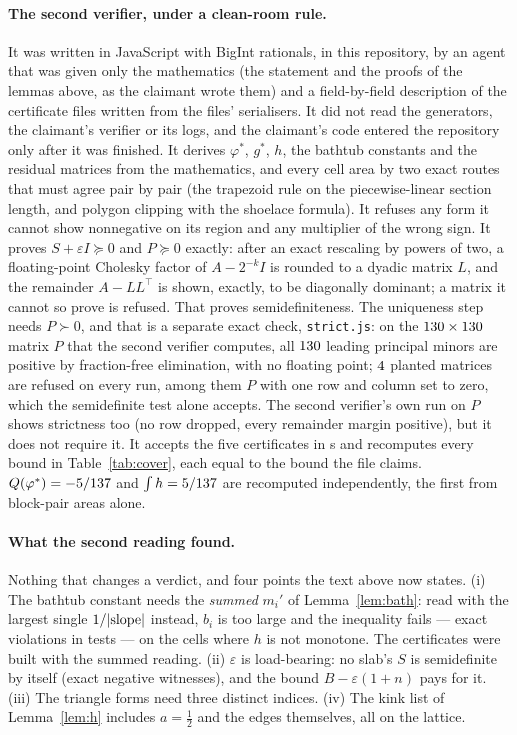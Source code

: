 \documentclass[11pt]{article}
\newcommand{\vphi}{\varphi}
\begin{document}
\paragraph{The second verifier, under a clean-room rule.} It was written in JavaScript with BigInt rationals, in this repository, by an agent that was given only the mathematics (the statement and the proofs of the lemmas above, as the claimant wrote them) and a field-by-field description of the certificate files written from the files' serialisers. It did not read the generators, the claimant's verifier or its logs, and the claimant's code entered the repository only after it was finished. It derives $\vphi^*$, $g^*$, $h$, the bathtub constants and the residual matrices from the mathematics, and every cell area by two exact routes that must agree pair by pair (the trapezoid rule on the piecewise-linear section length, and polygon clipping with the shoelace formula). It refuses any form it cannot show nonnegative on its region and any multiplier of the wrong sign. It proves $S+\varepsilon I\succeq0$ and $P\succeq0$ exactly: after an exact rescaling by powers of two, a floating-point Cholesky factor of $A-2^{-k}I$ is rounded to a dyadic matrix $L$, and the remainder $A-LL^\top$ is shown, exactly, to be diagonally dominant; a matrix it cannot so prove is refused. That proves semidefiniteness. The uniqueness step needs $P\succ0$, and that is a separate exact check, \texttt{strict.js}: on the $130\times130$ matrix $P$ that the second verifier computes, all $130$ leading principal minors are positive by fraction-free elimination, with no floating point; $4$ planted matrices are refused on every run, among them $P$ with one row and column set to zero, which the semidefinite test alone accepts. The second verifier's own run on $P$ shows strictness too (no row dropped, every remainder margin positive), but it does not require it. It accepts the five certificates in \VerifySeconds{} s and recomputes every bound in Table~\ref{tab:cover}, each equal to the bound the file claims. $Q(\vphi^*)=\QstarVal$ and $\int h=5/137$ are recomputed independently, the first from block-pair areas alone.

\paragraph{What the second reading found.} Nothing that changes a verdict, and four points the text above now states. (i) The bathtub constant needs the \emph{summed} $m_i'$ of Lemma~\ref{lem:bath}: read with the largest single $1/\lvert \text{slope} \rvert$ instead, $b_i$ is too large and the inequality fails --- \BathtubViol{} exact violations in \BathtubTests{} tests --- on the cells where $h$ is not monotone. The certificates were built with the summed reading. (ii) $\varepsilon$ is load-bearing: no slab's $S$ is semidefinite by itself (exact negative witnesses), and the bound $B-\varepsilon(1+n)$ pays for it. (iii) The triangle forms need three distinct indices. (iv) The kink list of Lemma~\ref{lem:h} includes $a=\frac12$ and the edges themselves, all on the lattice.
\end{document}
